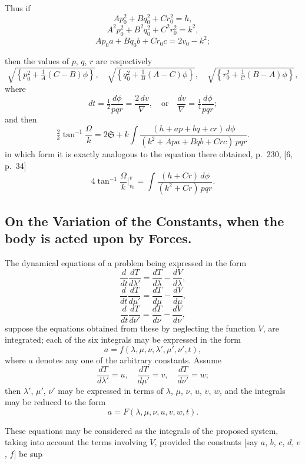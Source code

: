\documentclass[11pt]{article}
\begin{document}
Thus if
\[
Ap_0^2 + Bq_0^2 + Cr_0^2 = h,
\]
\[
A^2p_0^2 + B^2q_0^2 + C^2r_0^2 = k^2,
\]
\[
A p_0 a + B q_0 b + C r_0 c = 2v_0 - k^2;
\]

\newpage
\setcounter{page}{242}

then the values of $p$, $q$, $r$ are respectively
\[
\sqrt{\left\{p_0^2 + \tfrac{1}{A}(C - B)\phi\right\}},\quad
\sqrt{\left\{q_0^2 + \tfrac{1}{B}(A - C)\phi\right\}},\quad
\sqrt{\left\{r_0^2 + \tfrac{1}{C}(B - A)\phi\right\}},
\]
where
\[
dt = \tfrac{1}{2}\frac{d\phi}{pqr} = \frac{2\,dv}{\nabla},\quad \text{or}\quad \frac{dv}{\nabla} = \tfrac{1}{4}\frac{d\phi}{pqr};
\]
and then
\[
\tfrac{2}{k}\tan^{-1}\!\frac{\Omega}{k} = 2\mathfrak{S} + k\!\int\!\frac{(h + ap + bq + cr)\,d\phi}{(k^2 + Apa + Bqb + Crc)\,pqr}.
\]
in which form it is exactly analogous to the equation there obtained, p.~230, [6, p.~34]
\[
4\tan^{-1}\!\frac{\Omega}{k}\Big|_{v_0}^{v} = \int\!\frac{(h + Cr)\,d\phi}{(k^2 + Cr)\,pqr}.
\]

\bigskip
\subsection*{On the Variation of the Constants, when the body is acted upon by Forces.}

The dynamical equations of a problem being expressed in the form
\[
\frac{d}{dt}\frac{dT}{d\lambda'} = \frac{dT}{d\lambda} - \frac{dV}{d\lambda},
\]
\[
\frac{d}{dt}\frac{dT}{d\mu'} = \frac{dT}{d\mu} - \frac{dV}{d\mu},
\]
\[
\frac{d}{dt}\frac{dT}{d\nu'} = \frac{dT}{d\nu} - \frac{dV}{d\nu},
\]
suppose the equations obtained from these by neglecting the function $V$, are integrated; each of the six integrals may be expressed in the form
\[
a = f(\lambda, \mu, \nu, \lambda', \mu', \nu', t),
\]
where $a$ denotes any one of the arbitrary constants. Assume
\[
\frac{dT}{d\lambda'} = u,\quad \frac{dT}{d\mu'} = v,\quad \frac{dT}{d\nu'} = w;
\]
then $\lambda'$, $\mu'$, $\nu'$ may be expressed in terms of $\lambda$, $\mu$, $\nu$, $u$, $v$, $w$, and the integrals may be reduced to the form
\[
a = F(\lambda, \mu, \nu, u, v, w, t).
\]

These equations may be considered as the integrals of the proposed system, taking into account the terms involving $V$, provided the constants [say $a$, $b$, $c$, $d$, $e$, $f$] be sup\-

\newpage
\setcounter{page}{243}
\end{document}
